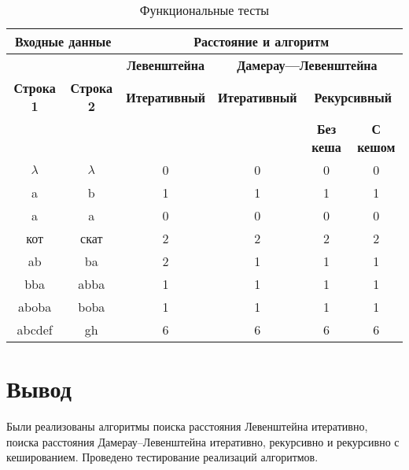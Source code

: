 \begin{table}[ht]
	\small
	\begin{center}
		\begin{threeparttable}
			\caption{Функциональные тесты}
			\label{tbl:func_tests}
			\begin{tabular}{|c|c|c|c|c|c|}
				\hline
				\multicolumn{2}{|c|}{\bfseries Входные данные}
				& \multicolumn{4}{c|}{\bfseries Расстояние и алгоритм} \\ 
				\hline 
				&
				& \multicolumn{1}{c|}{\bfseries Левенштейна} 
				& \multicolumn{3}{c|}{\bfseries Дамерау---Левенштейна} \\ \cline{3-6}
				
				\bfseries Строка 1 & \bfseries Строка 2 & \bfseries Итеративный & \bfseries Итеративный
				
				& \multicolumn{2}{c|}{\bfseries Рекурсивный} \\ \cline{5-6}
				& & & & \bfseries Без кеша & \bfseries С кешом \\
				\hline
				$\lambda$ & $\lambda$ & 0 & 0 & 0 & 0 \\
				\hline
				a & b & 1 & 1 & 1 & 1 \\
				\hline
				a & a & 0 & 0 & 0 & 0 \\
				\hline
				кот & скат & 2 & 2 & 2 & 2 \\
				\hline
				ab & ba & 2 & 1 & 1 & 1 \\
				\hline
				bba & abba & 1 & 1 & 1 & 1 \\
				\hline
				aboba & boba & 1 & 1 & 1 & 1 \\
				\hline
				abcdef & gh & 6 & 6 & 6 & 6 \\
				\hline
				
			\end{tabular}	
		\end{threeparttable}
	\end{center}
\end{table}

\section*{Вывод}

Были реализованы алгоритмы поиска расстояния Левенштейна итеративно, поиска расстояния Дамерау–Левенштейна итеративно, рекурсивно и рекурсивно с кешированием.
Проведено тестирование реализаций алгоритмов.
